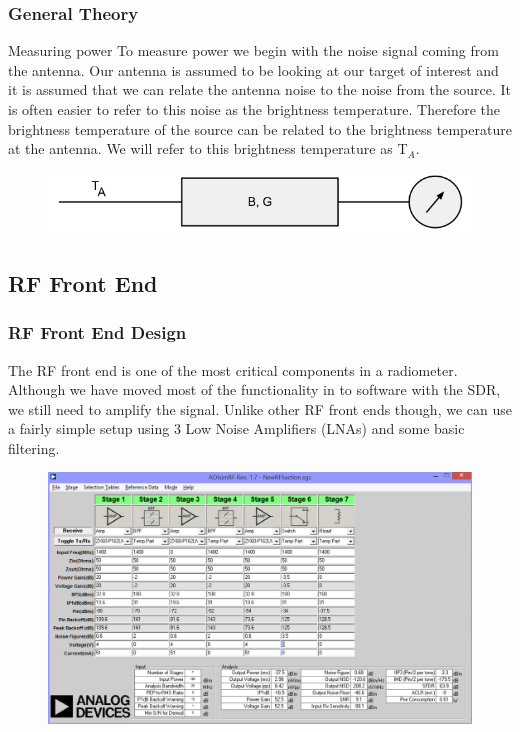\documentclass[notes]{beamer}
\begin{document}
\begin{frame}
\frametitle{General Theory}
\begin{block}{Measuring power}
To measure power we begin with the noise signal coming from the antenna.  Our antenna is assumed to be looking at our target of interest and it is assumed that we can relate the antenna noise to the noise from the source.  It is often easier to refer to this noise as the brightness temperature.  Therefore the brightness temperature of the source can be related to the brightness temperature at the antenna.  We will refer to this brightness temperature as T$_{A}$\cite{Ulaby}.  

{\begin{figure}[h!tb] 
\centering
\includegraphics[width=\textwidth]{../Images/simple_rad.png}
\label{simplerad}
\end{figure}
}
\end{block}
\end{frame}

\subsection{RF Front End}
\begin{frame}
\frametitle{RF Front End Design}

The RF front end is one of the most critical components in a radiometer.  Although we have moved most of the functionality in to software with the SDR, we still need to amplify the signal.  Unlike other RF front ends though, we can use a fairly simple setup using 3 Low Noise Amplifiers (LNAs) and some basic filtering.  


\begin{figure}\label{AD_RFSIM}
\includegraphics[width=0.6\linewidth]{images/RF_Front_end.png}
\end{figure}
\end{frame}
\end{document}
